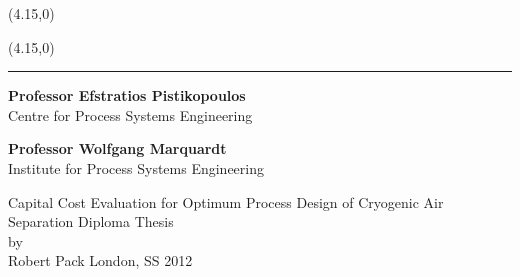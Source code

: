 
\vspace*{-1.0cm} \thispagestyle{empty}
\begin{minipage}[b]{17cm}
\begin{minipage}[b]{8.5cm}
	\begin{picture}(4.15,0)
	\end{picture}
\end{minipage}
\begin{minipage}[b]{6.95cm}
	\begin{flushright}
		\begin{picture}(4.15,0)
		\end{picture}
	\end{flushright}
\end{minipage}
\end{minipage}
\rule{\textwidth}{0.5pt}

\begin{minipage}[b]{8.5cm}
	\begin{flushleft}
		\textcolor{ImperialLightBlue}{
		\textbf{Professor Efstratios Pistikopoulos} \\ Centre for Process Systems Engineering}
	\end{flushleft}
\end{minipage}
\begin{minipage}[b]{8.3cm}
	\begin{flushright}
		\textcolor{ImperialLightBlue}{
		\textbf{Professor Wolfgang Marquardt} \\ Institute for Process Systems Engineering}
	\end{flushright}
\end{minipage}




\begin{center}
	\vspace{3cm}
	 \Huge  Capital Cost Evaluation for Optimum Process Design of Cryogenic Air Separation
	\vspace{1cm}
	 \vfill \LARGE
	{Diploma Thesis\\
	by\\
	Robert Pack} \vfill{London, SS 2012}
\end{center}

